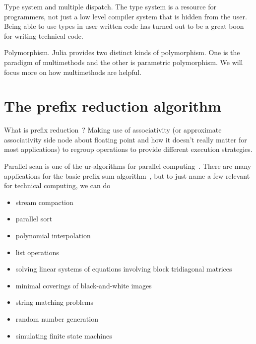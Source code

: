 \documentclass{sig-alternate}
\newcommand{\TODO}[1]{\todo[inline]{#1}}
\begin{document}
Type system and multiple dispatch. The type system is a resource for programmers, not just a low level compiler system that is hidden from the user. Being able to use types in user written code has turned out to be a great boon for writing technical code.

Polymorphism. Julia provides two distinct kinds of polymorphism. One is the paradigm of multimethods and the other is parametric polymorphism. We will focus more on how multimethods are helpful.

\TODO{State that we use Julia v0.3.1.}

\section{The prefix reduction algorithm}
\label{sec:prefix}

What is prefix reduction~\cite{Iverson1979,Ladner1980,Brent1982}? Making use of associativity (or approximate associativity side node about floating point and how it doesn't really matter for most applications)  to regroup operations to provide different execution strategies.

Parallel scan is one of the ur-algorithms for parallel computing~\cite{Kruskal1985,Blelloch1989,Bell2012}.
There are many applications for the basic prefix sum algorithm~\cite{Blelloch1990,Blelloch1993}, but to just name a few relevant for technical computing, we can do 

\begin{itemize}

	\item stream compaction~\cite{Harris2007}

	\item parallel sort~\cite{Blelloch1989}

	\item polynomial interpolation~\cite{Egecioglu1990}

	\item list operations~\cite{Hillis1986,Gorlatch1999}

	\item solving linear systems of equations involving block tridiagonal matrices~\cite{Mathias1995}

	\item minimal coverings of black-and-white images~\cite{Moitra1991}

	\item string matching problems~\cite{Chi1992}

	\item random number generation~\cite{Lu1996}

	\item simulating finite state machines~\cite{Ladner1980}
\end{itemize}
\end{document}
